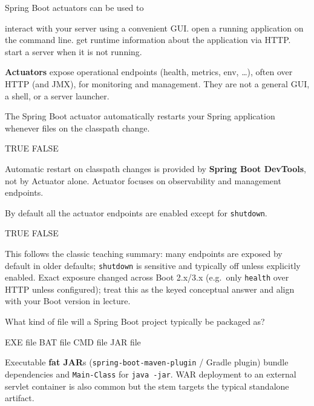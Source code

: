 \question[4]
Spring Boot actuators can be used to
\begin{choices}
  \choice interact with your server using a convenient GUI.
  \choice open a running application on the command line.
  \CorrectChoice get runtime information about the application via HTTP.
  \choice start a server when it is not running.
\end{choices}
\begin{solution}
  \textbf{Actuators} expose operational endpoints (health, metrics, env, \ldots), often over HTTP (and JMX), for monitoring and management. They are not a general GUI, a shell, or a server launcher.
\end{solution}

\question[4]
The Spring Boot actuator automatically restarts your Spring application whenever files on the classpath change.
\begin{choices}
  \choice TRUE
  \CorrectChoice FALSE
\end{choices}
\begin{solution}
  Automatic restart on classpath changes is provided by \textbf{Spring Boot DevTools}, not by Actuator alone. Actuator focuses on observability and management endpoints.
\end{solution}

\question[4]
By default all the actuator endpoints are enabled except for \texttt{shutdown}.
\begin{choices}
  \CorrectChoice TRUE
  \choice FALSE
\end{choices}
\begin{solution}
  This follows the classic teaching summary: many endpoints are exposed by default in older defaults; \texttt{shutdown} is sensitive and typically off unless explicitly enabled. Exact exposure changed across Boot 2.x/3.x (e.g.\ only \texttt{health} over HTTP unless configured); treat this as the keyed conceptual answer and align with your Boot version in lecture.
\end{solution}

\question[4]
What kind of file will a Spring Boot project typically be packaged as?
\begin{choices}
  \choice EXE file
  \choice BAT file
  \choice CMD file
  \CorrectChoice JAR file
\end{choices}
\begin{solution}
  Executable \textbf{fat JAR}s (\texttt{spring-boot-maven-plugin} / Gradle plugin) bundle dependencies and \texttt{Main-Class} for \texttt{java -jar}. WAR deployment to an external servlet container is also common but the stem targets the typical standalone artifact.
\end{solution}

